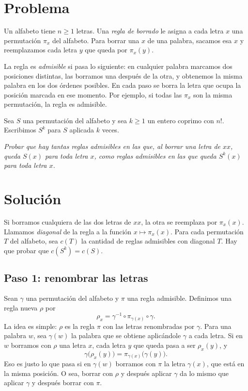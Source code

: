 \documentclass[11pt]{amsproc}
\begin{document}
\section*{Problema}

Un alfabeto tiene $n\ge 1$ letras. Una \emph{regla de borrado} le asigna a
cada letra $x$ una permutación $\pi_x$ del alfabeto. Para borrar una $x$ de
una palabra, sacamos esa $x$ y reemplazamos cada letra $y$ que queda por
$\pi_x(y)$.

La regla es \emph{admisible} si pasa lo siguiente: en cualquier palabra
marcamos dos posiciones distintas, las borramos una después de la otra, y
obtenemos la misma palabra en los dos órdenes posibles. En cada paso se borra
la letra que ocupa la posición marcada en ese momento. Por ejemplo, si todas
las $\pi_x$ son la misma permutación, la regla es admisible.

Sea $S$ una permutación del alfabeto y sea $k\ge 1$ un entero coprimo con
$n!$. Escribimos $S^k$ para $S$ aplicada $k$ veces.

{\itshape Probar que hay tantas reglas admisibles en las que, al borrar una
letra de $xx$, queda $S(x)$ para toda letra $x$, como reglas admisibles en
las que queda $S^k(x)$ para toda letra $x$.}

\section*{Solución}

Si borramos cualquiera de las dos letras de $xx$, la otra se reemplaza por
$\pi_x(x)$. Llamamos \emph{diagonal} de la regla a la función
$x\mapsto\pi_x(x)$. Para cada permutación $T$ del alfabeto, sea $c(T)$ la
cantidad de reglas admisibles con diagonal $T$. Hay que probar que
$c(S^k)=c(S)$.

\subsection*{Paso 1: renombrar las letras}

Sean $\gamma$ una permutación del alfabeto y $\pi$ una regla admisible.
Definimos una regla nueva $\rho$ por
\[
  \rho_x=\gamma^{-1}\circ\pi_{\gamma(x)}\circ\gamma .
\]
La idea es simple: $\rho$ es la regla $\pi$ con las letras renombradas por
$\gamma$. Para una palabra $w$, sea $\gamma(w)$ la palabra que se obtiene
aplicándole $\gamma$ a cada letra. Si en $w$ borramos con $\rho$ una letra
$x$, cada letra $y$ que queda pasa a ser $\rho_x(y)$, y
\[
  \gamma\bigl(\rho_x(y)\bigr)=\pi_{\gamma(x)}\bigl(\gamma(y)\bigr).
\]
Eso es justo lo que pasa si en $\gamma(w)$ borramos con $\pi$ la letra
$\gamma(x)$, que está en la misma posición. O sea, borrar con $\rho$ y
después aplicar $\gamma$ da lo mismo que aplicar $\gamma$ y después borrar
con $\pi$.
\end{document}
